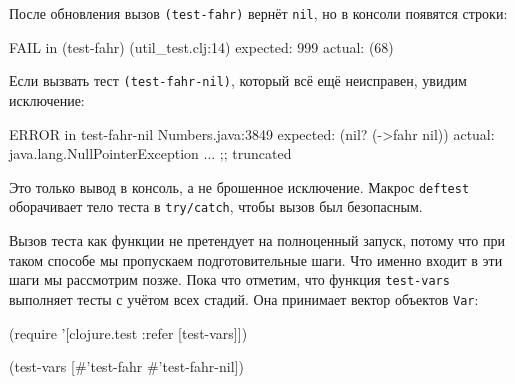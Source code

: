 После обновления вызов \verb|(test-fahr)| вернёт \verb|nil|, но в консоли
появятся строки:

\begin{english}
  \begin{clojure}
FAIL in (test-fahr) (util_test.clj:14)
expected: 999
  actual: (68)
  \end{clojure}
\end{english}

Если вызвать тест \verb|(test-fahr-nil)|, который всё ещё неисправен,
увидим исключение:

\ifnarrow

\begin{english}
  \begin{clojure}
ERROR in test-fahr-nil Numbers.java:3849
expected: (nil? (->fahr nil))
  actual: java.lang.NullPointerException
    ... ;; truncated
  \end{clojure}
\end{english}

\else

\begin{english}
\end{english}

\fi

Это только вывод в консоль, а не брошенное исключение. Макрос \verb|deftest|
оборачивает тело теста в \verb|try/catch|, чтобы вызов был безопасным.

Вызов теста как функции не претендует на полноценный запуск, потому что при
таком способе мы пропускаем подготовительные шаги. Что именно входит в эти шаги
мы рассмотрим позже. Пока что отметим, что функция \verb|test-vars| выполняет
тесты с учётом всех стадий. Она принимает вектор объектов \verb|Var|:

\ifnarrow

\begin{english}
  \begin{clojure}
(require
  '[clojure.test :refer [test-vars]])

(test-vars
  [#'test-fahr #'test-fahr-nil])
  \end{clojure}
\end{english}

